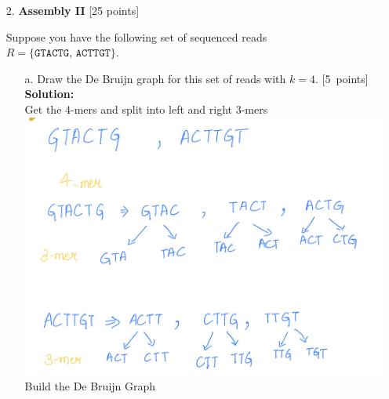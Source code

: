 \begin{enumerate}
\begin{enumerate}
\vspace{1cm}

\end{enumerate}
\newpage
\begin{enumerate}
\item[2.] \textbf{Assembly II} [25 points]

Suppose you have the following set of sequenced reads $R = \{\texttt{GTACTG, ACTTGT} \}. $

\begin{enumerate}
\item[a.]  Draw the De Bruijn graph for this set of reads with $k=4$. [5~points] \\

\textbf{Solution:}\\
Get the 4-mers and split into left and right 3-mers\\
\includegraphics[scale=0.2]{2a1.jpeg}\\
\newline
Build the De Bruijn Graph \\

\end{enumerate}
\end{enumerate}
\end{enumerate}
